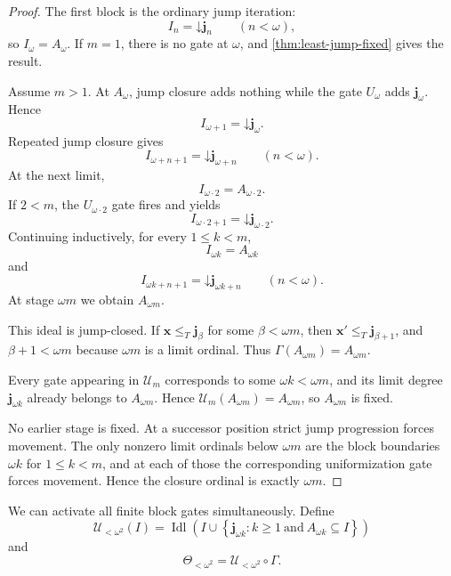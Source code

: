 \documentclass[11pt]{article}
\theoremstyle{definition}
\theoremstyle{remark}
\newcommand{\down}{\mathord{\downarrow}}
\newcommand{\leT}{\leq_T}
\begin{document}
\begin{proof}
The first block is the ordinary jump iteration:
\[
I_n=\down\mathbf j_n
\qquad(n<\omega),
\]
so $I_\omega=A_\omega$. If $m=1$, there is no gate at $\omega$, and \cref{thm:least-jump-fixed} gives the result.

Assume $m>1$. At $A_\omega$, jump closure adds nothing while the gate $U_\omega$ adds $\mathbf j_\omega$. Hence
\[
I_{\omega+1}=\down\mathbf j_\omega.
\]
Repeated jump closure gives
\[
I_{\omega+n+1}=\down\mathbf j_{\omega+n}
\qquad(n<\omega).
\]
At the next limit,
\[
I_{\omega\cdot2}=A_{\omega\cdot2}.
\]
If $2<m$, the $U_{\omega\cdot2}$ gate fires and yields
\[
I_{\omega\cdot2+1}=\down\mathbf j_{\omega\cdot2}.
\]
Continuing inductively, for every $1\leq k<m$,
\begin{equation}
I_{\omega k}=A_{\omega k}
\label{eq:block-boundary}
\end{equation}
and
\begin{equation}
I_{\omega k+n+1}=\down\mathbf j_{\omega k+n}
\qquad(n<\omega).
\label{eq:inside-block}
\end{equation}
At stage $\omega m$ we obtain $A_{\omega m}$.

This ideal is jump-closed. If $\mathbf x\leT\mathbf j_\beta$ for some $\beta<\omega m$, then
$\mathbf x'\leT\mathbf j_{\beta+1}$, and $\beta+1<\omega m$ because $\omega m$ is a limit ordinal. Thus $\Gamma(A_{\omega m})=A_{\omega m}$.

Every gate appearing in $\mathcal U_m$ corresponds to some $\omega k<\omega m$, and its limit degree $\mathbf j_{\omega k}$ already belongs to $A_{\omega m}$. Hence $\mathcal U_m(A_{\omega m})=A_{\omega m}$, so $A_{\omega m}$ is fixed.

No earlier stage is fixed. At a successor position strict jump progression forces movement. The only nonzero limit ordinals below $\omega m$ are the block boundaries $\omega k$ for $1\leq k<m$, and at each of those the corresponding uniformization gate forces movement. Hence the closure ordinal is exactly $\omega m$.
\end{proof}

We can activate all finite block gates simultaneously. Define
\begin{equation}
\mathcal U_{<\omega^2}(I)
=
\operatorname{Idl}\!\left(
I\cup
\left\{
\mathbf j_{\omega k}:
k\geq1
\ \text{and}\ 
A_{\omega k}\subseteq I
\right\}
\right)
\label{eq:Uomega2}
\end{equation}
and
\begin{equation}
\Theta_{<\omega^2}
=
\mathcal U_{<\omega^2}\circ\Gamma.
\label{eq:Thetaomega2}
\end{equation}
\end{document}
